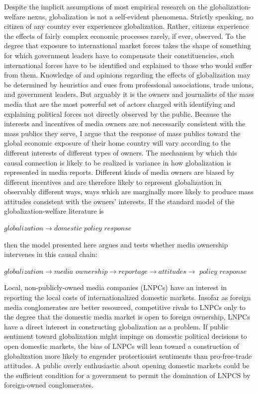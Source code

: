 \documentclass[12pt]{report}
\begin{document}
	Despite the implicit assumptions of most empirical research on the globalization-welfare nexus, globalization is not a self-evident phenomena. Strictly speaking, no citizen of any country ever experiences globalization. Rather, citizens experience the effects of fairly complex economic processes rarely, if ever, observed. To the degree that exposure to international market forces takes the shape of something for which government leaders have to compensate their constituencies, such international forces have to be identified and explained to those who would suffer from them. Knowledge of and opinions regarding the effects of globalization may be determined by heuristics and cues from professional associations, trade unions, and government leaders. But arguably it is the owners and journalists of the mass media that are the most powerful set of actors charged with identifying and explaining political forces not directly observed by the public. Because the interests and incentives of media owners are not necessarily consistent with the mass publics they serve, I argue that the response of mass publics toward the global economic exposure of their home country will vary according to the different interests of different types of owners. The mechanism by which this causal connection is likely to be realized is variance in how globalization is represented in media reports.
	Different kinds of media owners are biased by different incentives and are therefore likely to represent globalization in observably different ways, ways which are marginally more likely to produce mass attitudes consistent with the owners' interests. If the standard model of the globalization-welfare literature is 

\begin{center}
$globalization \rightarrow domestic$ $policy$ $response$
\end{center}
then the model presented here argues and tests whether media ownership intervenes in this causal chain:

\begin{center}
$globalization \rightarrow media$ $ownership \rightarrow reportage \rightarrow attitudes \rightarrow$ $policy$ $response$
\end{center}

Local, non-publicly-owned media companies (LNPCs) have an interest in reporting the local costs of internationalized domestic markets. Insofar as foreign media conglomerates are better resourced, competitive rivals to LNPCs only to the degree that the domestic media market is open to foreign ownership, LNPCs have a direct interest in constructing globalization as a problem. If public sentiment toward globalization might impinge on domestic political decisions to open domestic markets, the bias of LNPCs will lean toward a construction of globalization more likely to engender protectionist sentiments than pro-free-trade attitudes. A public overly enthusiastic about opening domestic markets could be the sufficient condition for a government to permit the domination of LNPCS by foreign-owned conglomerates.
\end{document}
